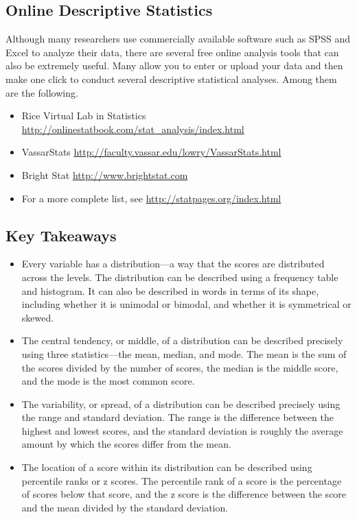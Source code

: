 \subsection{Online Descriptive Statistics}

Although many researchers use commercially available software such as SPSS and Excel to analyze their data, there are several free online analysis tools that can also be extremely useful. Many allow you to enter or upload your data and then make one click to conduct several descriptive statistical analyses. Among them are the following.

\begin{itemize}
\item Rice Virtual Lab in Statistics
\url{http://onlinestatbook.com/stat_analysis/index.html}

\item VassarStats
\url{http://faculty.vassar.edu/lowry/VassarStats.html}

\item Bright Stat
\url{http://www.brightstat.com}

\item For a more complete list, see \url{http://statpages.org/index.html}
\end{itemize}

\subsection{Key Takeaways}
\begin{fullwidth}
\begin{itemize}
\item Every variable has a distribution---a way that the scores are distributed across the levels. The distribution can be described using a frequency table and histogram. It can also be described in words in terms of its shape, including whether it is unimodal or bimodal, and whether it is symmetrical or skewed.

\item The central tendency, or middle, of a distribution can be described precisely using three statistics---the mean, median, and mode. The mean is the sum of the scores divided by the number of scores, the median is the middle score, and the mode is the most common score.

\item The variability, or spread, of a distribution can be described precisely using the range and standard deviation. The range is the difference between the highest and lowest scores, and the standard deviation is roughly the average amount by which the scores differ from the mean.

\item The location of a score within its distribution can be described using percentile ranks or z scores. The percentile rank of a score is the percentage of scores below that score, and the z score is the difference between the score and the mean divided by the standard deviation.
\end{itemize}
\end{fullwidth}



